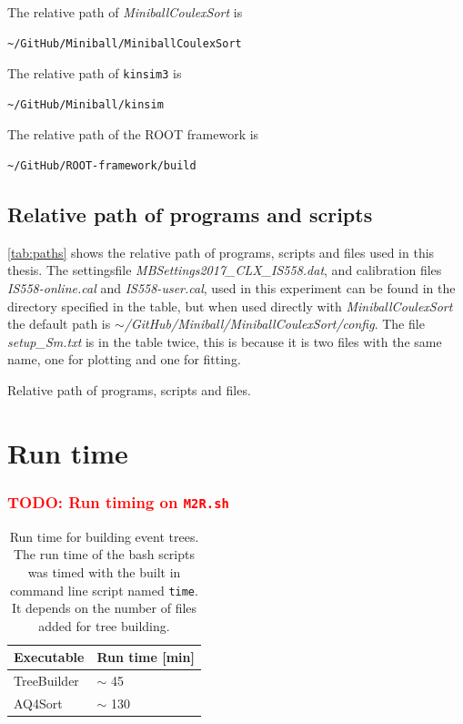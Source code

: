 \documentclass[twoside,english]{uiofysmaster/uiofysmaster}
\let\orgautoref\autoref
\renewcommand{\autoref}
        {%
		 \def\subsectionautorefname{Section}%
		 \def\subsubsectionautorefname{Section}%
          \orgautoref}
\begin{document}
\begin{appendices}
The relative path of \textsl{MiniballCoulexSort} is
\begin{lstlisting}[language=sh]
~/GitHub/Miniball/MiniballCoulexSort
\end{lstlisting}
The relative path of \texttt{kinsim3} is
\begin{lstlisting}[language=sh]
~/GitHub/Miniball/kinsim
\end{lstlisting}
The relative path of the ROOT framework is
\begin{lstlisting}[language=sh]
~/GitHub/ROOT-framework/build
\end{lstlisting}


\subsection{Relative path of programs and scripts}
\autoref{tab:paths} shows the relative path of programs, scripts and files used in this thesis. 
The settingsfile \textit{MBSettings2017\_CLX\_IS558.dat}, and calibration files \textit{IS558-online.cal} and \textit{IS558-user.cal}, used in this experiment can be found in the directory specified in the table, but when used directly with \textsl{MiniballCoulexSort} the default path is \textit{$\sim$/GitHub/Miniball/MiniballCoulexSort/config}.
The file \textit{setup\_Sm.txt} is in the table twice, this is because it is two files with the same name, one for plotting and one for fitting.

\begin{table}[ht]
    \centering
    \caption{Relative path of programs, scripts and files.}
	
	\label{tab:paths}
\end{table}


\section{Run time}

\subsubsection{\textcolor{red}{TODO: Run timing on \texttt{M2R.sh}}}

\begin{table}[ht] 
	\centering 
	\caption{Run time for building event trees. The run time of the bash scripts was timed with the built in command line script named \texttt{time}. It depends on the number of files added for tree building.}
	\label{tab:run_time}
	\begin{tabular}{ll}
		\hline
		Executable   &  Run time [min] \\
		\hline
		TreeBuilder  &  $\sim$ 45   \\
		AQ4Sort       &  $\sim$ 130  \\
		\hline
	\end{tabular}
\end{table}


\end{appendices}
\end{document}
